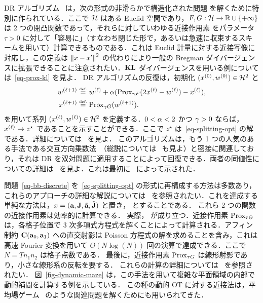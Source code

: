 DR アルゴリズム~\citep{Lions-Mercier-DR} は，次の形式の非滑らかで構造化された問題
を解くために特別に作られている．ここで $\Hh$ はある Euclid 空間であり，$F, G : \Hh \rightarrow \RR \cup \{+\infty\}$ は 2 つの閉凸関数であって，それらに対していわゆる近接作用素
をパラメータ $\tau>0$ に対して「容易に」（すなわち閉じた形で，あるいは急速に収束するスキームを用いて）計算できるものである．これは Euclid 計量に対する近接写像に対応し，この定義は $\norm{x-x'}^2$ の代わりにより一般の Bregman ダイバージェンスに拡張できることに注意されたい．$\KLD$ ダイバージェンスを用いる例については~\eqref{eq-prox-kl} を見よ．
%
DR アルゴリズムの反復は，初期化 $(x^{(0)}, w^{(0)})\in \Hh^2$ と
\begin{equation}\label{eq-dr-iters}
\begin{aligned}
	\itt{w} &\eqdef  \it{w} + \al (\Prox_{\ga F} (2\it{x}-\it{w})-\it{x}),\\
	\itt{x} &\eqdef  \Prox_{\ga G}(\itt{w}).
\end{aligned}
\end{equation}
を用いて系列 $(\it{x}, \it{w}) \in \Hh^2$ を定義する．$0 < \al < 2$ かつ $\ga > 0$ ならば，$\it{x} \rightarrow z^\star$ であることを示すことができる．ここで $z^\star$ は~\eqref{eq-splitting-opt} の解である．詳細については~\citep{Combettes2007} を見よ．
%
このアルゴリズムは，もう 1 つの人気のある手法である交互方向乗数法~\citep{GabayMercier,GlowinskiMarroco}（総説については~\citep{BoydADMM} も見よ）と密接に関連しており，それは DR を双対問題に適用することによって回復できる．両者の同値性についての詳細は~\citep{FPapPeyOud13} を見よ．これは最初に~\citep{Eckstein1992} によって示された．

問題~\eqref{eq-bb-discrete} を~\eqref{eq-splitting-opt} の形式に再構成する方法は多数あり，これらのアプローチの詳細な解説については~\citep{FPapPeyOud13} を参照されたい．これを達成する単純な方法は，$x=(\a,\MomentD,\tilde\a,\tilde\MomentD)$ と置き，
とすることである．
%
これら 2 つの関数の近接作用素は効率的に計算できる．
%
実際，
が成り立つ．近接作用素 $\Prox_{\tau\Theta}$ は，各格子位置で 3 次多項式方程式を解くことによって計算される．アフィン制約 $\BBConstrD(\a_0,\a_1)$ への直交射影は Poisson 方程式の解を求めることを含み，これは高速 Fourier 変換を用いて $O(N\log(N))$ 回の演算で達成できる．ここで $N=Tn_1 n_2$ は格子点数である．
%
最後に，近接作用素 $\Prox_{\tau G}$ は線形射影であり，小さな線形系の反転を要する．
%
これらの計算の詳細については~\citet{FPapPeyOud13} を参照されたい．
%
図~\ref{fig-dynamic-maze} は，この手法を用いて複雑な平面領域の内部で動的補間を計算する例を示している．
%
この種の動的 OT に対する近接法は，平均場ゲーム~\citep{benamou2015augmented} のような関連問題を解くためにも用いられてきた．

